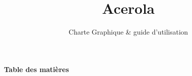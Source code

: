 \documentclass{acerola}
\title{Acerola}
\subtitle{Charte Graphique \& guide d'utilisation}
\begin{document}

\makecover

{\sffamily\Large\bfseries\color{dark} Table des matières}
\vspace{4pt}\hrulefull
\tableofcontents

\newpage


\end{document}
